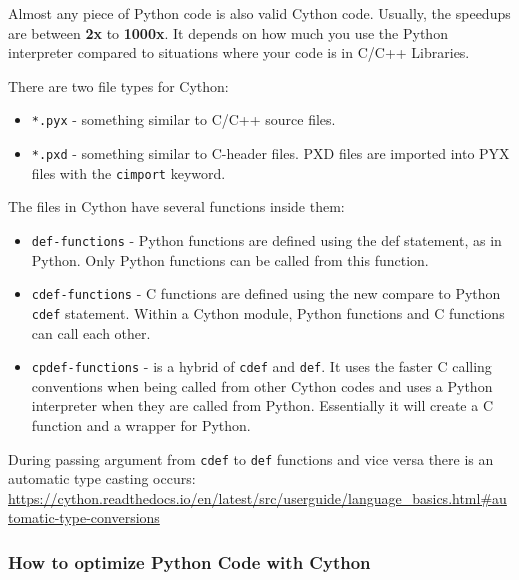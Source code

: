 \documentclass[
]{article}
\begin{document}
Almost any piece of Python code is also valid Cython code. Usually, the
speedups are between \textbf{2x} to \textbf{1000x}. It depends on how
much you use the Python interpreter compared to situations where your
code is in C/C++ Libraries.

There are two file types for Cython:

\begin{itemize}
\item
  \texttt{*.pyx} - something similar to C/C++ source files.
\item
  \texttt{*.pxd} - something similar to C-header files. PXD files are
  imported into PYX files with the \texttt{cimport} keyword.
\end{itemize}

The files in Cython have several functions inside them:

\begin{itemize}
\item
  \texttt{def-functions} - Python functions are defined using the def
  statement, as in Python. Only Python functions can be called from this
  function.
\item
  \texttt{cdef-functions} - C functions are defined using the new
  compare to Python \texttt{cdef} statement. Within a Cython module,
  Python functions and C functions can call each other.
\item
  \texttt{cpdef-functions} - is a hybrid of \texttt{cdef} and
  \texttt{def}. It uses the faster C calling conventions when being
  called from other Cython codes and uses a Python interpreter when they
  are called from Python. Essentially it will create a C function and a
  wrapper for Python.
\end{itemize}

During passing argument from \texttt{cdef} to \texttt{def} functions and
vice versa there is an automatic type casting occurs:\\
\url{https://cython.readthedocs.io/en/latest/src/userguide/language_basics.html\#automatic-type-conversions}

\hypertarget{how-to-optimize-python-code-with-cython}{%
\subsubsection{How to optimize Python Code with
Cython}\label{how-to-optimize-python-code-with-cython}}
\end{document}

